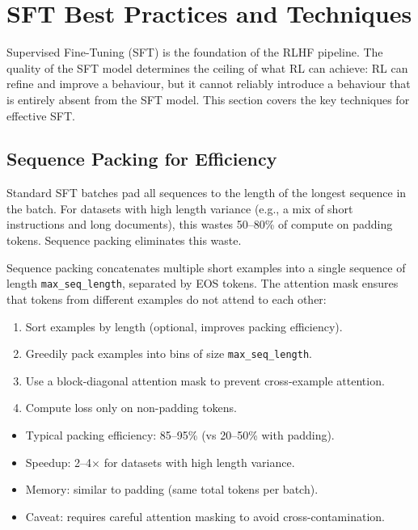 \chapter{SFT Best Practices and Techniques}
\label{sec:sft-best-practices}

Supervised Fine-Tuning (SFT) is the foundation of the RLHF pipeline. The quality of the SFT model determines the ceiling of what RL can achieve: RL can refine and improve a behaviour, but it cannot reliably introduce a behaviour that is entirely absent from the SFT model. This section covers the key techniques for effective SFT.

\section{Sequence Packing for Efficiency}
\label{sec:sequence-packing}

\begin{intuitionbox}
Standard SFT batches pad all sequences to the length of the longest sequence in the batch. For datasets with high length variance (e.g., a mix of short instructions and long documents), this wastes 50--80\% of compute on padding tokens. Sequence packing eliminates this waste.
\end{intuitionbox}

Sequence packing concatenates multiple short examples into a single sequence of length \texttt{max\_seq\_length}, separated by EOS tokens. The attention mask ensures that tokens from different examples do not attend to each other:

\begin{enumerate}
  \item Sort examples by length (optional, improves packing efficiency).
  \item Greedily pack examples into bins of size \texttt{max\_seq\_length}.
  \item Use a block-diagonal attention mask to prevent cross-example attention.
  \item Compute loss only on non-padding tokens.
\end{enumerate}

\begin{keybox}
\begin{itemize}
  \item Typical packing efficiency: 85--95\% (vs 20--50\% with padding).
  \item Speedup: 2--4$\times$ for datasets with high length variance.
  \item Memory: similar to padding (same total tokens per batch).
  \item Caveat: requires careful attention masking to avoid cross-contamination.
\end{itemize}
\end{keybox}

